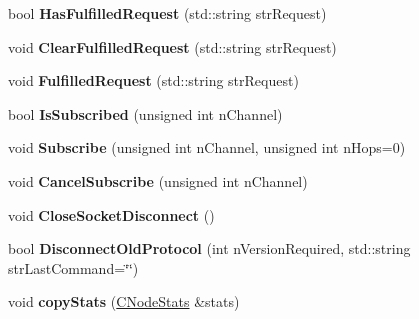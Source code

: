 \begin{DoxyCompactItemize}
\item 
\mbox{\label{class_c_node_ae94af0e82ca84242e420fc53debe6f25}} 
bool {\bfseries Has\+Fulfilled\+Request} (std\+::string str\+Request)
\item 
\mbox{\label{class_c_node_aa57c7ad448501f5c8667d430b390b5ea}} 
void {\bfseries Clear\+Fulfilled\+Request} (std\+::string str\+Request)
\item 
\mbox{\label{class_c_node_a5b378bdd447e2f1e63ced2ae5b36ed76}} 
void {\bfseries Fulfilled\+Request} (std\+::string str\+Request)
\item 
\mbox{\label{class_c_node_a2309cc5f763bce683337201ea5a640a2}} 
bool {\bfseries Is\+Subscribed} (unsigned int n\+Channel)
\item 
\mbox{\label{class_c_node_a47f2a21abf98bd2d2dba2894124d3114}} 
void {\bfseries Subscribe} (unsigned int n\+Channel, unsigned int n\+Hops=0)
\item 
\mbox{\label{class_c_node_ac1be1dbc7917e7f5956dd063bd6f271d}} 
void {\bfseries Cancel\+Subscribe} (unsigned int n\+Channel)
\item 
\mbox{\label{class_c_node_a63a6091a0b0fc0987d9436e1ec708423}} 
void {\bfseries Close\+Socket\+Disconnect} ()
\item 
\mbox{\label{class_c_node_a0b71b637cd5504f4421e6019e84bfd0d}} 
bool {\bfseries Disconnect\+Old\+Protocol} (int n\+Version\+Required, std\+::string str\+Last\+Command=\char`\"{}\char`\"{})
\item 
\mbox{\label{class_c_node_aaa77188d9df85b80e3f8a30292acf6a9}} 
void {\bfseries copy\+Stats} (\mbox{\hyperlink{class_c_node_stats}{C\+Node\+Stats}} \&stats)
\end{DoxyCompactItemize}
